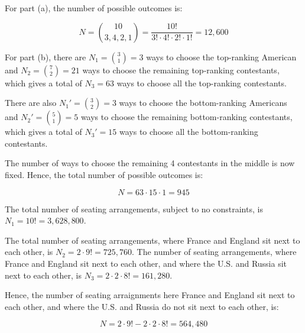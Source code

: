\documentclass[a4paper,12pt]{article}
\begin{document}
For part (a), the number of possible outcomes is:

\[ N = \binom{10}{3,4,2,1} = \frac{10!}{3! \cdot 4! \cdot 2! \cdot 1!} = 12,600 \]

\vspace{2mm}
For part (b), there are $N_1 = \binom{3}{1} = 3$ ways to choose the top-ranking American and $N_2 = \binom{7}{2} = 21$ ways to choose the remaining top-ranking contestants, which gives a total of $N_3 = 63$ ways to choose all the top-ranking contestants. 

There are also $N_1' = \binom{3}{2} = 3$ ways to choose the bottom-ranking Americans and $N_2' = \binom{5}{1} = 5$ ways to choose the remaining bottom-ranking contestants, which gives a total of $N_3' = 15$ ways to choose all the bottom-ranking contestants. 

The number of ways to choose the remaining 4 contestants in the middle is now fixed. Hence, the total number of possible outcomes is:

\[ N = 63 \cdot 15 \cdot 1 = 945 \]

\vspace{4mm}

The total number of seating arrangements, subject to no constraints, is $N_1 = 10! = 3,628,800$.

The total number of seating arrangements, where France and England sit next to each other, is $N_2 = 2 \cdot 9! = 725,760$. The number of seating arrangements, where France and England sit next to each other, and where the U.S. and Russia sit next to each other, is $N_3 = 2 \cdot 2 \cdot 8! = 161,280$. 

Hence, the number of seating arraignments here France and England sit next to each other, and where the U.S. and Russia do not sit next to each other, is:

\[ N = 2 \cdot 9! - 2 \cdot 2 \cdot 8! = 564,480 \]

\vspace{4mm}
\end{document}

